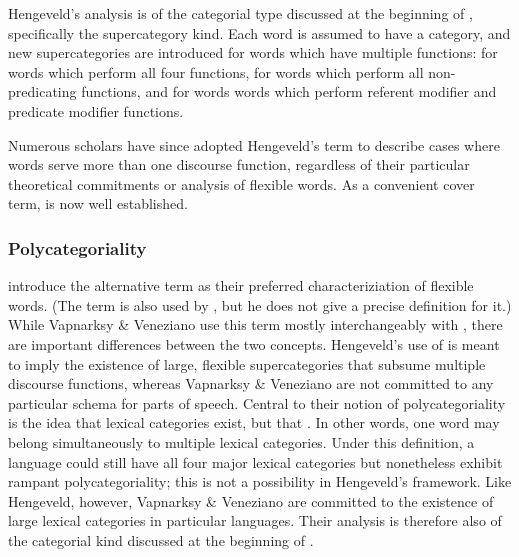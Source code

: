 
Hengeveld's analysis is of the categorial type discussed at the beginning of , specifically the supercategory kind. Each word is assumed to have a category, and new supercategories are introduced for words which have multiple functions:  for words which perform all four functions,  for words which perform all non-predicating functions, and  for words words which perform referent modifier and predicate modifier functions.

Numerous scholars have since adopted Hengeveld's term  to describe cases where words serve more than one discourse function, regardless of their particular theoretical commitments or analysis of flexible words. As a convenient cover term,  is now well established.

\subsubsection{Polycategoriality}
\label{sec:2.3.1.2}

\textcite[4]{VapnarksyVeneziano2017} introduce the alternative term  as their preferred characteriziation of flexible words. (The term is also used by \textcite{Carter2006}, but he does not give a precise definition for it.) While Vapnarksy \& Veneziano use this term mostly interchangeably with , there are important differences between the two concepts. Hengeveld's use of  is meant to imply the existence of large, flexible supercategories that subsume multiple discourse functions, whereas Vapnarksy \& Veneziano are not committed to any particular schema for parts of speech. Central to their notion of polycategoriality is the idea that lexical categories exist, but that . In other words, one word may belong simultaneously to multiple lexical categories. Under this definition, a language could still have all four major lexical categories but nonetheless exhibit rampant polycategoriality; this is not a possibility in Hengeveld's framework. Like Hengeveld, however, Vapnarksy \& Veneziano are committed to the existence of large lexical categories in particular languages. Their analysis is therefore also of the categorial kind discussed at the beginning of .


